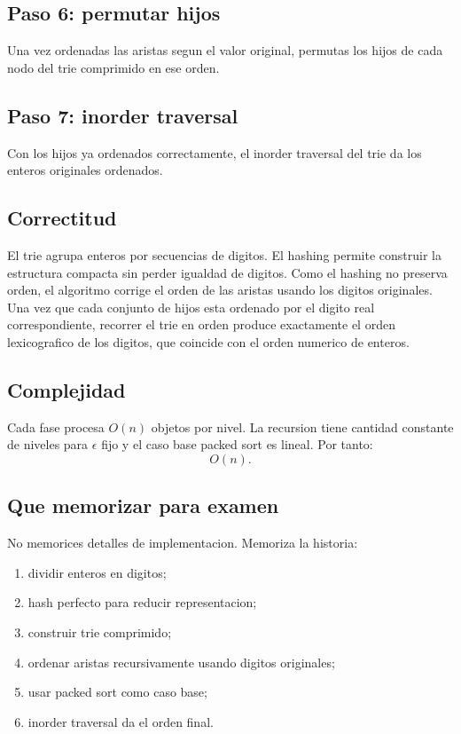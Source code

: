 \documentclass[10pt]{article}
\newcommand{\bigO}{O}
\begin{document}
\subsection{Paso 6: permutar hijos}
Una vez ordenadas las aristas segun el valor original, permutas los hijos de
cada nodo del trie comprimido en ese orden.

\subsection{Paso 7: inorder traversal}
Con los hijos ya ordenados correctamente, el inorder traversal del trie da los
enteros originales ordenados.

\subsection{Correctitud}
El trie agrupa enteros por secuencias de digitos. El hashing permite construir
la estructura compacta sin perder igualdad de digitos. Como el hashing no
preserva orden, el algoritmo corrige el orden de las aristas usando los digitos
originales. Una vez que cada conjunto de hijos esta ordenado por el digito real
correspondiente, recorrer el trie en orden produce exactamente el orden
lexicografico de los digitos, que coincide con el orden numerico de enteros.

\subsection{Complejidad}
Cada fase procesa $\bigO(n)$ objetos por nivel. La recursion tiene cantidad
constante de niveles para $\epsilon$ fijo y el caso base packed sort es lineal.
Por tanto:
\[
\bigO(n).
\]

\subsection{Que memorizar para examen}
No memorices detalles de implementacion. Memoriza la historia:
\begin{enumerate}[leftmargin=*]
\item dividir enteros en digitos;
\item hash perfecto para reducir representacion;
\item construir trie comprimido;
\item ordenar aristas recursivamente usando digitos originales;
\item usar packed sort como caso base;
\item inorder traversal da el orden final.
\end{enumerate}
\end{document}
